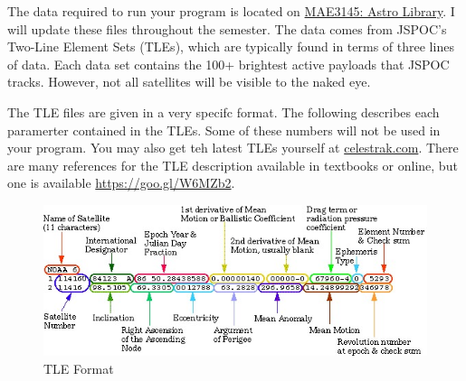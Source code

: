 \documentclass[11pt, reqno]{article}    %
\begin{document}
The data required to run your program is located on \href{https://github.com/fdcl-gwu/MAE3145_library}{MAE3145: Astro Library}.
I will update these files throughout the semester.
The data comes from JSPOC's Two-Line Element Sets (TLEs), which are typically found in terms of three lines of data.
Each data set contains the 100+ brightest active payloads that JSPOC tracks.
However, not all satellites will be visible to the naked eye.

The TLE files are given in a very specifc format. 
The following describes each paramerter contained in the TLEs.
Some of these numbers will not be used in your program. 
You may also get teh latest TLEs yourself at \href{www.clestrak.com}{celestrak.com}.
There are many references for the TLE description available in textbooks or online, but one is available \href{https://goo.gl/W6MZb2}{https://goo.gl/W6MZb2}.

\begin{figure}
    \centering
    \includegraphics[width=\textwidth, keepaspectratio]{figures/tle.jpeg}
    \caption{TLE Format \label{fig:tle}}
\end{figure}
\end{document}

